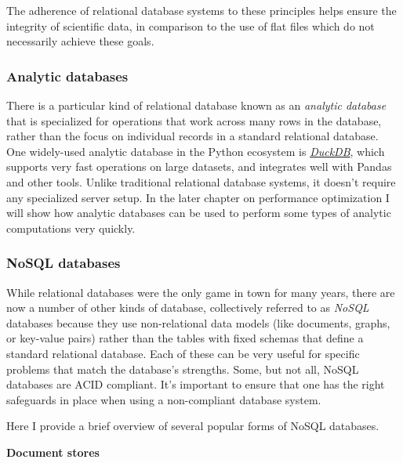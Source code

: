 The adherence of relational database systems to these principles helps ensure the integrity of scientific data, in comparison to the use of flat files which do not necessarily achieve these goals.

\subsubsection{Analytic databases}

There is a particular kind of relational database known as an \textit{analytic database} that is specialized for operations that work across many rows in the database, rather than the focus on individual records in a standard relational database.  One widely-used analytic database in the Python ecosystem is \href{https://duckdb.org/}{\textit{DuckDB}}, which supports very fast operations on large datasets, and integrates well with Pandas and other tools. Unlike traditional relational database systems, it doesn't require any specialized server setup.  In the later chapter on performance optimization I will show how analytic databases can be used to perform some types of analytic computations very quickly.

\subsubsection{NoSQL databases}

While relational databases were the only game in town for many years, there are now a number of other kinds of database, collectively referred to as \textit{NoSQL} databases because they use non-relational data models (like documents, graphs, or key-value pairs) rather than the tables with fixed schemas that define a standard relational database.  Each of these can be very useful for specific problems that match the database's strengths. Some, but not all, NoSQL databases are ACID compliant.  It's important to ensure that one has the right safeguards in place when using a non-compliant database system.

Here I provide a brief overview of several popular forms of NoSQL databases.

\textbf{Document stores}

